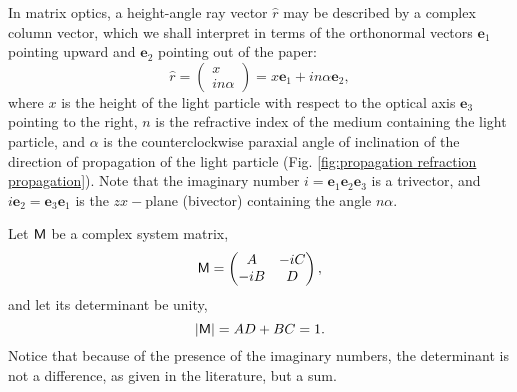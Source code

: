 \documentclass[11pt,twocolumn]{article}
\begin{document}
In matrix optics, a height-angle ray vector $\hat r$ may be  described by a complex column vector, which we shall interpret in terms of the orthonormal vectors $\mathbf e_1$ pointing upward and $\mathbf e_2$ pointing out of the paper:\cite{SugonMcNamara_2008_arXiv:0812.0664v1_p3}
\begin{equation}
\label{eq:r is r e_1 + inalpha e_2}
\hat r=
\begin{pmatrix}
x\\
in\alpha
\end{pmatrix}
=x\mathbf e_1+in\alpha\mathbf e_2,
\end{equation}
where $x$ is the height of the light particle with respect to the optical axis $\mathbf e_3$ pointing to the right, $n$ is the refractive index of the medium containing the light particle, and $\alpha$ is the counterclockwise paraxial angle of inclination of the direction of propagation of the light particle (Fig. \ref{fig:propagation refraction propagation}).  Note that the imaginary number $i=\mathbf e_1\mathbf e_2\mathbf e_3$ is a trivector, and $i\mathbf e_2=\mathbf e_3\mathbf e_1$ is the $zx-$plane (bivector) containing the angle $n\alpha$. 

Let $\textsf M$ be a complex system matrix,
\begin{equation}
\label{eq:M matrix}
\textsf M=
\begin{pmatrix}
A&-iC\\
-iB&D
\end{pmatrix},
\end{equation}
and let its determinant be unity,
\begin{equation}
\label{eq:det M is AD + BC is 1}
|\textsf M|=AD + BC=1.
\end{equation}
Notice that because of the presence of the imaginary numbers, the determinant is not a difference, as given in the literature, but a sum.
\end{document}
